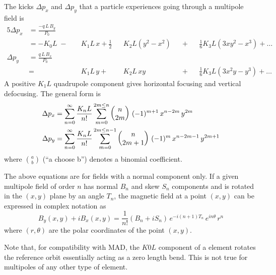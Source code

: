 The kicks $\Delta p_x$ and $\Delta p_y$ that a particle experiences going through a multipole field
is
\begin{alignat}{5}
  \Delta p_x & = \frac{-q \, L \, B_y}{P_0} \label{pqlbp1} \\
             & = -K_0 L \;-\; 
             && K_1 L \, x \plus 
             \frac{1}{2} && K_2 L (y^2 - x^2) && \plus 
             && \frac{1}{6} K_3 L (3x y^2 - x^3) \plus \ldots 
             \nonumber \\
  \Delta p_y & = \frac{q \, L \, B_x}{P_0} \label{pqlbp2} \\
             & =     
             && K_1 L \, y \plus 
             && K_2 L \, xy && \plus 
             && \frac{1}{6} K_3L (3x^2 y - y^3) \plus \ldots \nonumber 
\end{alignat}
A positive $K_1L$ quadrupole component gives horizontal focusing and vertical defocusing. The
general form is
\begin{align}
  \Delta p_x &= \sum_{n = 0}^{\infty} \frac{K_n L}{n!} 
             \sum_{m = 0}^{2m \le n}
             \begin{pmatrix} n \cr 2m \end{pmatrix} \,
             (-1)^{m+1} \, x^{n-2m} \, y^{2m} \\
  \Delta p_y &= \sum_{n = 0}^{\infty} \frac{K_n L}{n!} 
             \sum_{m = 0}^{2m \le n-1}
             \begin{pmatrix} n \cr 2m+1 \end{pmatrix} \,
             (-1)^{m} \, x^{n-2m-1} \, y^{2m+1}
\end{align}
where $\binom{a}{b}$ (``a choose b'') denotes a binomial coefficient.

The above equations are for fields with a normal component only. If a given multipole field of order
$n$ has normal $B_n$ and skew $S_n$ components and is rotated in the $(x, y)$ plane by an angle
$T_n$, the magnetic field at a point $(x,y)$ can be expressed in complex notation as
\begin{equation}
  B_y(x,y) + i B_x(x,y) = 
    \frac{1}{n!} (B_n + i S_n) \, e^{-i(n+1)T_n} \, e^{i n \theta} \, r^n 
  \label{bib1nb}
\end{equation}
where $(r, \theta)$ are the polar coordinates of the point $(x, y)$.

Note that, for compatibility with MAD, the $K0L$ component of a  element rotates the
reference orbit essentially acting as a zero length bend. This is not true for multipoles of any
other type of element.

